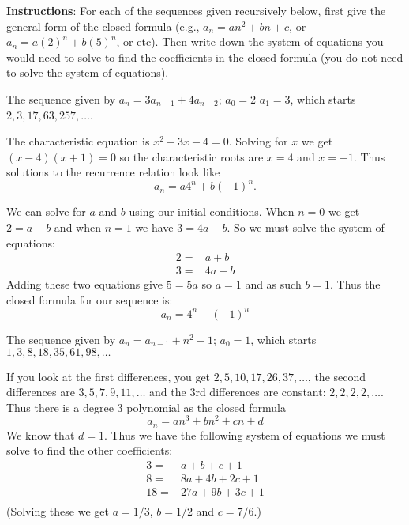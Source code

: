 \documentclass[12pt]{exam}
\begin{document}
\noindent\textbf{Instructions}: For each of the sequences given recursively below, first give the \underline{general form} of the \underline{closed formula} (e.g., $a_n = an^2 + bn + c$, or $a_n = a(2)^n + b(5)^n$, or etc).  Then write down the \underline{system of equations} you would need to solve to find the coefficients in the closed formula (you do not need to solve the system of equations).
\begin{questions}
\question[5] The sequence given by $a_n = 3a_{n-1} + 4a_{n-2}$; $a_0 = 2$ $a_1 = 3$, which starts $2, 3, 17, 63, 257, \ldots$.

  \begin{solution}
      The characteristic equation is $x^2 - 3x - 4 = 0$.  Solving for $x$ we get $(x-4)(x+1) = 0$ so the characteristic roots are $x = 4$ and $x = -1$.  Thus solutions to the recurrence relation look like \[a_n = a 4^n + b(-1)^n.\]

      We can solve for $a$ and $b$ using our initial conditions.  When $n = 0$ we get $2 = a + b$ and when $n = 1$ we have $3 = 4a - b$.  So we must solve the system of equations:
      \begin{align*}
        2 = & a+b\\
        3 = & 4a - b
      \end{align*}
      Adding these two equations give $5 = 5a$ so $a = 1$ and as such $b = 1$.  Thus the closed formula for our sequence is:
      \[a_n = 4^n + (-1)^n\]
  \end{solution}
\vfill

\question[5] The sequence given by $a_n = a_{n-1} + n^2 + 1$; $a_0 = 1$, which starts $1, 3, 8, 18, 35, 61, 98,\ldots$
\begin{solution}
  If you look at the first differences, you get $2, 5, 10, 17, 26, 37,\ldots $, the second differences are $3, 5, 7, 9, 11,\ldots$ and the 3rd differences are constant: $2, 2, 2, 2, \ldots$.  Thus there is a degree 3 polynomial as the closed formula
  \[a_n = an^3 + bn^2 + cn + d\]
  We know that $d = 1$.  Thus we have the following system of equations we must solve to find the other coefficients:
  \begin{align*}
    3 =& a + b + c + 1\\
    8 =& 8a + 4b + 2c + 1\\
    18 = & 27a + 9b + 3c + 1\\
  \end{align*}
  (Solving these we get $a = 1/3$, $b = 1/2$ and $c = 7/6$.)
\end{solution}
\vfill
\end{questions}
\end{document}
